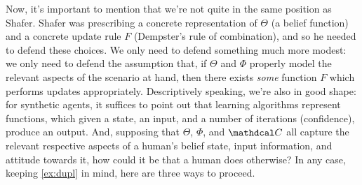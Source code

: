 \documentclass{article}
\def\confdom{\mathdcal C}
\begin{document}
Now, it's important to mention that we're not quite in the same position as Shafer.
Shafer was prescribing a concrete representation of $\Theta$ (a belief function) and a concrete update rule $F$ (Dempster's rule of combination), and so he needed to defend these choices. 
We only need to defend something much more modest: we only need to defend the assumption that, if $\Theta$ and $\Phi$ properly model the relevant aspects of the scenario at hand, then there exists \emph{some} function $F$ which performs updates appropriately. 
Descriptively speaking, we're also in good shape: for synthetic agents, it suffices to point out that learning algorithms represent functions, which given a state, an input, and a number of iterations (confidence), produce an output. 
And, supposing that $\Theta$, $\Phi$, and $\confdom$ all capture the relevant respective aspects of a human's belief state, input information, and attitude towards it, how could it be that a human does otherwise?
%
In any case, keeping \cref{ex:dupl} in mind, here are three ways to proceed.
\end{document}
